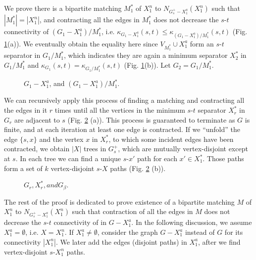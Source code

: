 \documentclass{article}
\begin{document}
We prove there is a bipartite matching $M_1^*$ of $X_1^n$ to $N_{G_s^+ - X_1^a}(X_1^n)$ such that
$|M_1^*| = |X_1^n|$, and contracting all the edges in $M_1^*$ does not decrease the $s$-$t$ connectivity of $(G_1 - X_1^a)/M_1^*$,
i.e. $\kappa_{G_1 - X_1^a}(s, t) \le \kappa_{(G_1 - X_1^a)/M_1^*}(s, t)$ (Fig. \ref{label_fig3}(a)).
We eventually obtain the equality here since $V_{M_1^*} \cup X_1^a$
form an $s$-$t$ separator in $G_1/M_1^*$, which indicates they are again a minimum separator $X_2^*$ in $G_1/M_1^*$ and
$\kappa_{G_1}(s, t) = \kappa_{G_1/M_1^*}(s, t)$ (Fig. \ref{label_fig3}(b)). Let $G_2 = G_1/M_1^*$.
\begin{figure}\begin{center}
\caption[Fig3]{$G_1 - X_1^a$, and $(G_1 - X_1^a)/M_1^*$.}
\label{label_fig3}
\end{center}\end{figure}

We can recursively apply this process of finding a matching and contracting all the edges in it
$r$ times until all the vertices in the minimum $s$-$t$ separator $X_r^*$ in $G_r$
 are adjacent to $s$ (Fig. \ref{label_fig4} (a)).
 This process is guaranteed to terminate as $G$ is finite,
and at each iteration at least one edge is contracted.
 If we ``unfold'' the edge $\{s, x\}$ and the vertex $x$ in $X_r^*$, to which some incident
edges have been contracted, we obtain  $|X|$ trees in $G_s^+$, which are mutually vertex-disjoint except at $s$.
In each tree we can find a unique $s$-$x'$ path for each $x'\in X_1^*$.
Those paths form a set of $k$ vertex-disjoint $s$-$X$ paths (Fig. \ref{label_fig4} (b)).

\begin{figure}\begin{center}
\caption[Fig4]{$G_r, X_r^*, and G_\beta$.}
\label{label_fig4}
\end{center}\end{figure}

The rest of the proof is dedicated to prove existence of a bipartite matching $M$
of $X_1^n$ to $N_{G_s^+ - X_1^a}(X_1^n)$ such that
contraction of all the edges in $M$ does not decrease the $s$-$t$ connectivity of in $G - X_1^a$.
In the following discussion, we assume $X_1^a = \emptyset$, i.e. $X = X_1^n$.
If  $X_1^a \ne \emptyset$, consider the graph $G - {X_1^a}$ instead of $G$ for its connectivity
$|X_1^n|$. We later add the edges (disjoint paths) in $X_1^a$, after we find vertex-disjoint
$s$-$X_1^n$ paths.
\end{document}
